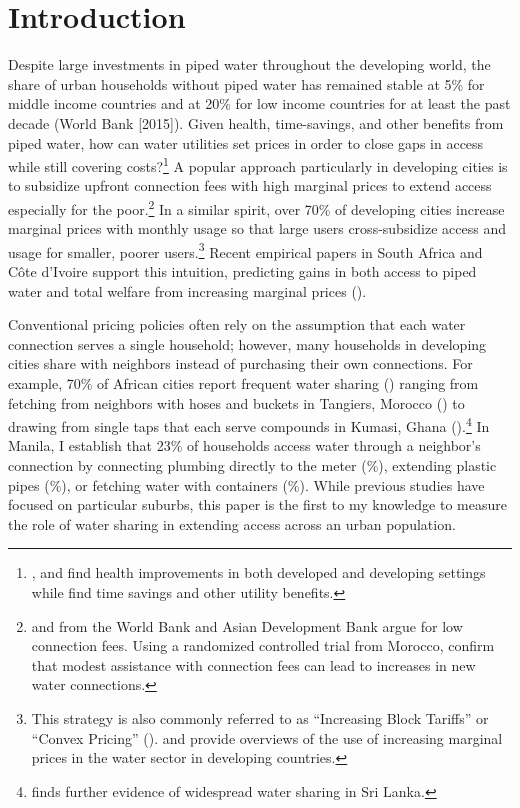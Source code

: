 \documentclass[12pt]{article}
\begin{document}
\section{Introduction}
 
Despite large investments in piped water throughout the developing world, the share of urban households without piped water has remained stable at 5\% for middle income countries and at 20\% for low income countries for at least the past decade (World Bank [2015]).  Given health, time-savings, and other benefits from piped water, how can water utilities set prices in order to close gaps in access while still covering costs?\footnote{\cite{gamper2010impact,cutler2005role}, and \cite{galiani2005water} find health improvements in both developed and developing settings while \cite{devoto2012happiness} find time savings and other utility benefits.}  A popular approach particularly in developing cities is to subsidize upfront connection fees with high marginal prices to extend access especially for the poor.\footnote{\cite{mcintosh2003asian} and \cite{komives2006distributional} from the World Bank and Asian Development Bank argue for low connection fees.  Using a randomized controlled trial from Morocco, \cite{devoto2012happiness} confirm that modest assistance with connection fees can lead to increases in new water connections.}  In a similar spirit, over 70\% of developing cities increase marginal prices with monthly usage so that large users cross-subsidize access and usage for smaller, poorer users.\footnote{This strategy is also commonly referred to as ``Increasing Block Tariffs'' or  ``Convex Pricing'' (\cite{borenstein2012redistributional}). \cite{hoque2013state} and \cite{boland2000political} provide overviews of the use of increasing marginal prices in the water sector in developing countries.}  Recent empirical papers in South Africa and C{\^o}te d'Ivoire support this intuition, predicting gains in both access to piped water and total welfare from increasing marginal prices (\cite{szabo2015value,diakite2009proposal}). 






Conventional pricing policies often rely on the assumption that each water connection serves a single household; however, many households in developing cities share with neighbors instead of purchasing their own connections.  For example, 70\% of African cities report frequent water sharing (\cite{keener2010provision}) ranging from fetching from neighbors with hoses and buckets in Tangiers, Morocco (\cite{devoto2012happiness}) to drawing from single taps that each serve compounds in Kumasi, Ghana (\cite{whittington1992possible}).\footnote{\cite{nauges2006water} finds further evidence of widespread water sharing in Sri Lanka.}  In Manila, I establish that 23\% of households access water through a neighbor's connection by connecting plumbing directly to the meter (\unskip\%), extending plastic pipes (\unskip\%), or fetching water with containers (\unskip\%).  While previous studies have focused on particular suburbs, this paper is the first to my knowledge to measure the role of water sharing in extending access across an urban population.
\end{document}
